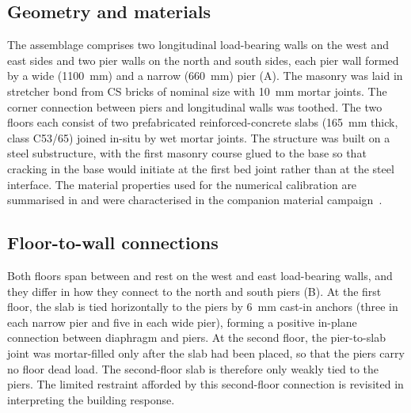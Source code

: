 \documentclass[AMA,twocolumn]{USG} %
\begin{document}
\subsection{Geometry and materials}
The assemblage comprises two longitudinal load-bearing walls on the west and east sides and two pier walls on the north and south sides, each pier wall formed by a wide (\qty{1100}{\milli\meter}) and a narrow (\qty{660}{\milli\meter}) pier (A).
The masonry was laid in stretcher bond from CS bricks of nominal size  with \qty{10}{\milli\meter} mortar joints. 
The corner connection between piers and longitudinal walls was toothed.
The two floors each consist of two prefabricated reinforced-concrete slabs (\qty{165}{\milli\meter} thick, class C53/65) joined in-situ by wet mortar joints.
The structure was built on a steel substructure, with the first masonry course glued to the base so that cracking in the base would initiate at the first bed joint rather than at the steel interface.
The material properties used for the numerical calibration are summarised in  and were characterised in the companion material campaign~\cite{Jafari2022AStructures,Jafari2021MaterialAnalysis}.

\subsection{Floor-to-wall connections}
Both floors span between and rest on the west and east load-bearing walls, and they differ in how they connect to the north and south piers (B). 
At the first floor, the slab is tied horizontally to the piers by \qty{6}{\milli\meter} cast-in anchors (three in each narrow pier and five in each wide pier), forming a positive in-plane connection between diaphragm and piers. 
At the second floor, the pier-to-slab joint was mortar-filled only after the slab had been placed, so that the piers carry no floor dead load.
The second-floor slab is therefore only weakly tied to the piers. 
The limited restraint afforded by this second-floor connection is revisited in interpreting the building response.
\end{document}
